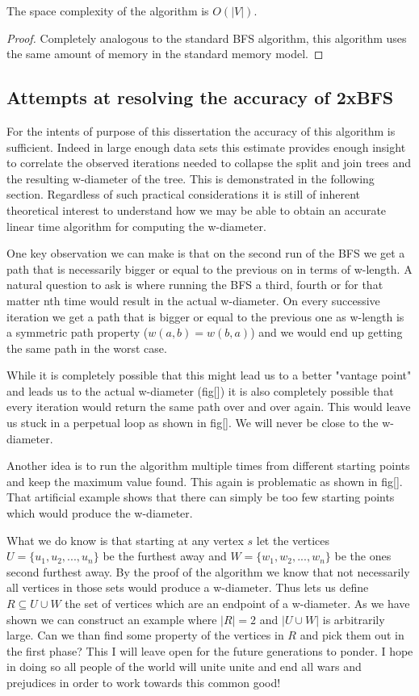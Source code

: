 \begin{lem} The space complexity of the algorithm is $O(|V|)$. \end{lem}

\begin{proof}
    Completely analogous to the standard BFS algorithm, this algorithm uses the same amount of memory in the standard memory model.
\end{proof}


\subsection{Attempts at resolving the accuracy of 2xBFS}

For the intents of purpose of this dissertation the accuracy of this algorithm is sufficient. Indeed in large enough data sets this estimate provides enough insight to correlate the observed iterations needed to collapse the split and join trees and the resulting w-diameter of the tree. This is demonstrated in the following section. Regardless of such practical considerations it is still of inherent theoretical interest to understand how we may be able to obtain an accurate linear time algorithm for computing the w-diameter.

One key observation we can make is that on the second run of the BFS we get a path that is necessarily bigger or equal to the previous on in terms of w-length. A natural question to ask is where running the BFS a third, fourth or for that matter nth time would result in the actual w-diameter. On every successive iteration we get a path that is bigger or equal to the previous one as w-length is a symmetric path property ($w(a, b) = w(b, a)$) and we would end up getting the same path in the worst case.

While it is completely possible that this might lead us to a better "vantage point" and leads us to the actual w-diameter (fig[]) it is also completely possible that every iteration would return the same path over and over again. This would leave us stuck in a perpetual loop as shown in fig[]. We will never be close to the w-diameter.

Another idea is to run the algorithm multiple times from different starting points and keep the maximum value found. This again is problematic as shown in fig[]. That artificial example shows that there can simply be too few starting points which would produce the w-diameter.

What we do know is that starting at any vertex $s$ let the vertices $U = \{u_1, u_2, ..., u_n\}$ be the furthest away and $W = \{w_1, w_2, ..., w_n\}$ be the ones second furthest away. By the proof of the algorithm we know that not necessarily all vertices in those sets would produce a w-diameter. Thus lets us define $R \subseteq U \cup W$ the set of vertices which are an endpoint of a w-diameter. As we have shown we can construct an example where $|R| = 2$ and $|U \cup W|$ is arbitrarily large. Can we than find some property of the vertices in $R$ and pick them out in the first phase? This I will leave open for the future generations to ponder. I hope in doing so all people of the world will unite unite and end all wars and prejudices in order to work towards this common good!

